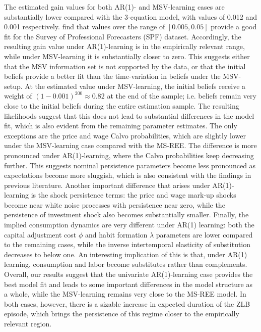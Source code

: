\documentclass[12pt,reqno]{article}
\numberwithin{equation}{section}
\begin{document}
The estimated gain values for both AR(1)- and MSV-learning cases are substantially lower compared with the 3-equation model, with values of 0.012 and 0.001 respectively. \cite{branch2006simple} find that values over the range of $[0.005,0.05]$ provide a good fit for the Survey of Professional Forecasters (SPF) dataset. Accordingly, the resulting gain value under AR(1)-learning is in the empirically relevant range, while under MSV-learning it is substantially closer to zero. This suggests either that the MSV information set is not supported by the data, or that the initial beliefs provide a better fit than the time-variation in beliefs under the MSV-setup. At the estimated value under MSV-learning, the initial beliefs receive a weight of $(1-0.001)^200 \approx 0.82$ at the end of the sample; i.e. beliefs remain very close to the initial beliefs during the entire estimation sample. The resulting likelihoods suggest that this does not lead to substantial differences in the model fit, which is also evident from the remaining parameter estimates. The only exceptions are the price and wage Calvo probabilities, which are slightly lower under the MSV-learning case compared with the MS-REE. The difference is more pronounced under AR(1)-learning, where the Calvo probabilities keep decreasing further. This suggests nominal persistence parameters become less pronounced as expectations become more sluggish, which is also consistent with the findings in previous literature. Another important difference that arises under AR(1)-learning is the shock persistence terms: the price and wage mark-up shocks become near white noise processes with persistence near zero, while the persistence of investment shock also becomes substantially smaller. Finally, the implied consumption dynamics are very different under AR(1) learning: both the capital adjustment cost $\phi$ and habit formation $\lambda$ parameters are lower compared to the remaining cases, while the inverse intertemporal elasticity of substitution decreases to below one. An interesting implication of this is that, under AR(1) learning, consumption and labor become substitutes rather than complements. \\
\noindent
Overall, our results suggest that the univariate AR(1)-learning case provides the best model fit and leads to some important differences in the model structure as a whole, while the MSV-learning remains very close to the MS-REE model. In both cases, however, there is a sizable increase in expected duration of the ZLB episode, which brings the persistence of this regime closer to the empirically relevant region. \\
\noindent
\end{document}
